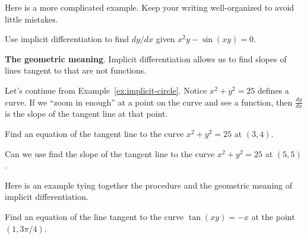 \documentclass[../main.tex]{subfiles}
\begin{document}
Here is a more complicated example. Keep your writing well-organized to avoid little mistakes.
\begin{example}
  Use implicit differentiation to find \(dy/dx\) given \(x^{2}y - \sin(xy) = 0\).

\end{example}

\clearpage
\textbf{The geometric meaning}. Implicit differentiation allows us to find slopes of lines tangent to  that are not functions. 

Let's continue from Example~\ref{ex:implicit-circle}. Notice \(x^{2} + y^{2} = 25\) defines a curve. If we ``zoom in enough'' at a point on the curve and see a function, then \(\tfrac{dy}{dx}\) is the slope of the tangent line at that point. 

\begin{center}
  
  \qquad
  
  \qquad
  
\end{center}

\begin{example}
  Find an equation of the tangent line to the curve \(x^{2} + y^{2} = 25\) at \((3,4)\).

\end{example}

\faComment{} Can we use find the slope of the tangent line to the curve \(x^{2} + y^{2} = 25\) at \((5,5)\).


\clearpage
Here is an example tying together the procedure and the geometric meaning of implicit differentiation.
\begin{example}
  Find an equation of the line tangent to the curve \(\tan(xy) = -x\) at the point \((1,3\pi/4)\).

\end{example}
\end{document}
